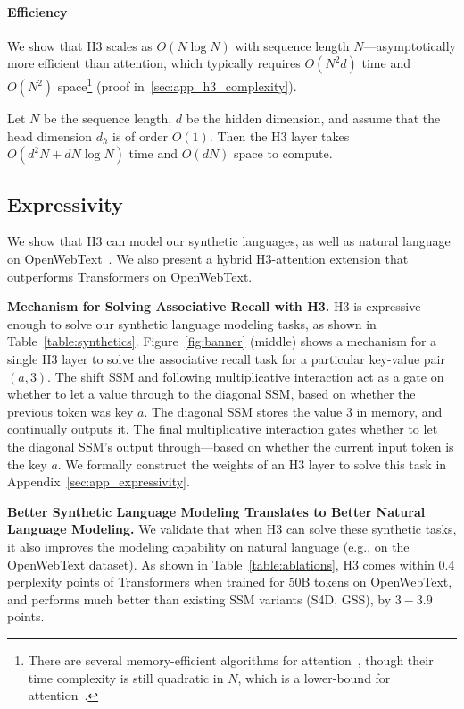 \paragraph{Efficiency}
We show that \textsc{H3} scales as $O(N \log N)$ with sequence length $N$---asymptotically more efficient than attention, which typically requires $O(N^2d)$ time and $O(N^2)$ space\footnote{There are several memory-efficient algorithms for attention~\citep{rabe2021self,dao2022flashattention}, though their time complexity is still quadratic in $N$, which is a lower-bound for attention~\citep{keles2022computational}.} (proof in~\ref{sec:app_h3_complexity}).

\begin{proposition}\label{thm:h3_complexity}
  Let $N$ be the sequence length, $d$ be the hidden dimension, and assume that the head dimension $d_h$ is of order $O(1)$. Then the H3 layer takes $O(d^2N + d N \log N)$ time and $O(dN)$ space to compute.
\end{proposition}

\subsection{Expressivity}
\label{sec:expressivity}

We show that \textsc{H3} can model our synthetic languages, as well as natural language on OpenWebText~\citep{Gokaslan2019OpenWeb}. We also present a hybrid \textsc{H3}-attention extension that outperforms Transformers on OpenWebText.

\textbf{Mechanism for Solving Associative Recall with H3.}
\textsc{H3} is expressive enough to solve our synthetic language modeling tasks, as shown in Table~\ref{table:synthetics}.
Figure~\ref{fig:banner} (middle) shows a mechanism for a single \textsc{H3} layer to solve the associative recall task for a particular key-value pair $(a, 3)$. The shift SSM and following multiplicative interaction act as a gate on whether to let a value through to the diagonal SSM, based on whether the previous token was key $a$. The diagonal SSM stores the value $3$ in memory, and continually outputs it. The final multiplicative interaction gates whether to let the diagonal SSM's output through---based on whether the current input token is the key $a$. We formally construct the weights of an \textsc{H3} layer to solve this task in Appendix~\ref{sec:app_expressivity}.

\textbf{Better Synthetic Language Modeling Translates to Better Natural Language Modeling.} We validate that when H3 can solve these synthetic tasks, it also improves the modeling capability on natural language (e.g., on the OpenWebText dataset). As shown in Table~\ref{table:ablations}, \textsc{H3} comes within 0.4 perplexity points of Transformers when trained for 50B tokens on OpenWebText, and performs much better than existing SSM variants (S4D, GSS), by $3-3.9$ points.


